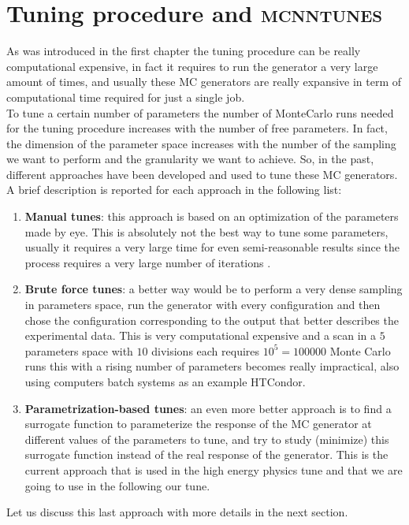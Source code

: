 \chapter{Tuning procedure and \textsc{mcnntunes}}
\label{chap:TuneprocedureCP5TuneandMCNNTUNES}


As was introduced in the first chapter the tuning procedure can be really computational expensive, in fact it requires to run the generator a very large amount of times, and usually these MC generators are really expansive in term of computational time required for just a single job.  
\\
To tune a certain number of parameters the number of MonteCarlo runs needed for the tuning procedure increases with the number of free parameters. In fact, the dimension of the parameter space increases with the number of the sampling we want to perform and the granularity we want to achieve. So, in the past, different approaches have been developed and used to tune these MC generators. A brief description is reported for each approach in the following list:
\begin{enumerate}[label=\arabic*)]
	\item \textbf{Manual tunes}: this approach is based on an optimization of the parameters made by eye. This is absolutely not the best way to tune some parameters, usually it requires a very large time for even semi-reasonable results since the process requires a very large number of iterations .   
	\item \textbf{Brute force tunes}: a better way would be to perform a very dense sampling in parameters space, run the generator with every configuration and then chose the configuration corresponding to the output that better describes the experimental data. This is very computational expensive and a scan in a $5$ parameters space with $10$ divisions each requires $10^5=100000$ Monte Carlo runs this with a rising number of parameters becomes really impractical, also using computers batch systems as an example HTCondor.   
	\item \textbf{Parametrization-based tunes}: an even more better approach is to find a surrogate function to parameterize the response of the MC generator at different values of the parameters to tune, and try to study (minimize) this surrogate function instead of the real response of the generator. This is the current approach that is used in the high energy physics tune and that we are going to use in the following our tune.
\end{enumerate}
Let us discuss this last approach with more details in the next section.

